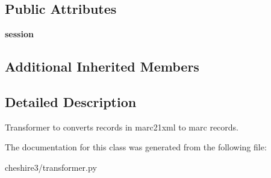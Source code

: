 \subsection*{Public Attributes}
\begin{DoxyCompactItemize}
\item 
\hypertarget{classcheshire3_1_1transformer_1_1_marc_transformer_a1a07eb8e7e8a1656f9e4a261d8910bd0}{{\bfseries session}}\label{classcheshire3_1_1transformer_1_1_marc_transformer_a1a07eb8e7e8a1656f9e4a261d8910bd0}

\end{DoxyCompactItemize}
\subsection*{Additional Inherited Members}


\subsection{Detailed Description}
\begin{DoxyVerb}Transformer to converts records in marc21xml to marc records.\end{DoxyVerb}
 

The documentation for this class was generated from the following file\-:\begin{DoxyCompactItemize}
\item 
cheshire3/transformer.\-py\end{DoxyCompactItemize}

